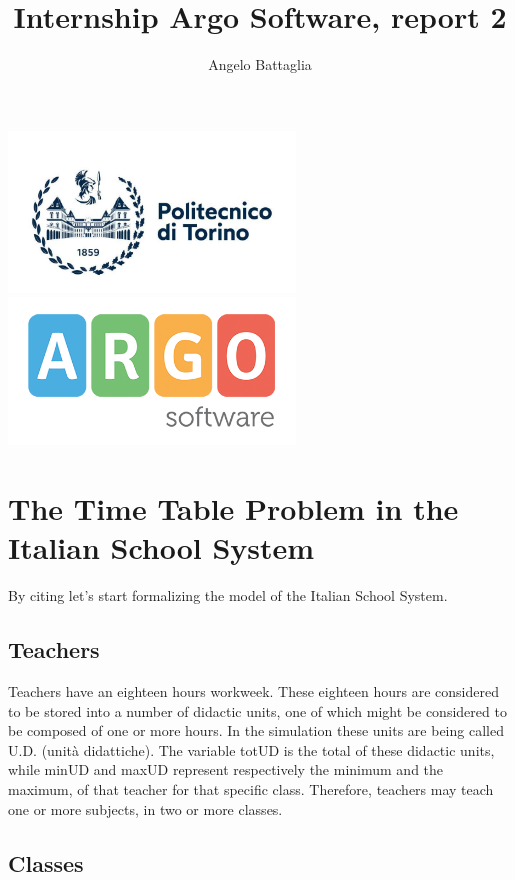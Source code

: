 \documentclass{article}
\author{Angelo Battaglia}
\title{Internship Argo Software, report 2}
\begin{document}
\maketitle

\begin{center}
\includegraphics[width=3in]{./images/polito.jpg}
\includegraphics[width=3in]{./images/og_logoargosoft.png}
\end{center}

\section{The Time Table Problem in the Italian School System}
By citing \textcite{colorni1992genetic} let's start formalizing 
the model of the Italian School System.


\subsection{Teachers}
Teachers have an eighteen hours workweek. These eighteen hours are
considered to be stored into a number of didactic units, one of which
might be considered to be composed of one or more hours. In the simulation
these units are being called U.D. (unità didattiche). The variable totUD is
the total of these didactic units, while minUD and maxUD represent respectively
the minimum and the maximum, of that teacher for that specific class. Therefore, 
teachers may teach one or more subjects, in two or more classes. 

\subsection{Classes}
\end{document}
